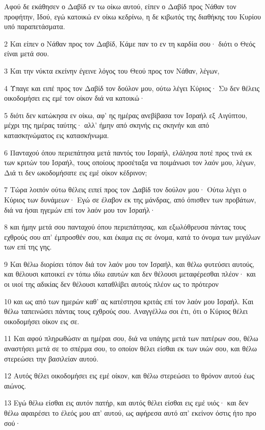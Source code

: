 \par Αφού δε εκάθησεν ο Δαβίδ εν τω οίκω αυτού, είπεν ο Δαβίδ προς Νάθαν τον προφήτην, Ιδού, εγώ κατοικώ εν οίκω κεδρίνω, η δε κιβωτός της διαθήκης του Κυρίου υπό παραπετάσματα.
\par 2 Και είπεν ο Νάθαν προς τον Δαβίδ, Κάμε παν το εν τη καρδία σου· διότι ο Θεός είναι μετά σου.
\par 3 Και την νύκτα εκείνην έγεινε λόγος του Θεού προς τον Νάθαν, λέγων,
\par 4 Ύπαγε και ειπέ προς τον Δαβίδ τον δούλον μου, ούτω λέγει Κύριος· Συ δεν θέλεις οικοδομήσει εις εμέ τον οίκον διά να κατοικώ·
\par 5 διότι δεν κατώκησα εν οίκω, αφ' ης ημέρας ανεβίβασα τον Ισραήλ εξ Αιγύπτου, μέχρι της ημέρας ταύτης· αλλ' ήμην από σκηνής εις σκηνήν και από κατασκηνώματος εις κατασκήνωμα.
\par 6 Πανταχού όπου περιεπάτησα μετά παντός του Ισραήλ, ελάλησα ποτέ προς τινά εκ των κριτών του Ισραήλ, τους οποίους προσέταξα να ποιμάνωσι τον λαόν μου, λέγων, Διά τι δεν ωκοδομήσατε εις εμέ οίκον κέδρινον;
\par 7 Τώρα λοιπόν ούτω θέλεις ειπεί προς τον Δαβίδ τον δούλον μου· Ούτω λέγει ο Κύριος των δυνάμεων· Εγώ σε έλαβον εκ της μάνδρας, από όπισθεν των προβάτων, διά να ήσαι ηγεμών επί τον λαόν μου τον Ισραήλ·
\par 8 και ήμην μετά σου πανταχού όπου περιεπάτησας, και εξωλόθρευσα πάντας τους εχθρούς σου απ' έμπροσθέν σου, και έκαμα εις σε όνομα, κατά το όνομα των μεγάλων των επί της γης.
\par 9 Και θέλω διορίσει τόπον διά τον λαόν μου τον Ισραήλ, και θέλω φυτεύσει αυτούς, και θέλουσι κατοικεί εν τόπω ιδίω εαυτών και δεν θέλουσι μεταφέρεσθαι πλέον· και οι υιοί της αδικίας δεν θέλουσι καταθλίβει αυτούς πλέον ως το πρότερον
\par 10 και ως από των ημερών καθ' ας κατέστησα κριτάς επί τον λαόν μου Ισραήλ. Και θέλω ταπεινώσει πάντας τους εχθρούς σου. Αναγγέλλω σοι έτι, ότι ο Κύριος θέλει οικοδομήσει οίκον εις σε.
\par 11 Και αφού πληρωθώσιν αι ημέραι σου, διά να υπάγης μετά των πατέρων σου, θέλω αναστήσει μετά σε το σπέρμα σου, το οποίον θέλει είσθαι εκ των υιών σου, και θέλω στερεώσει την βασιλείαν αυτού.
\par 12 Αυτός θέλει οικοδομήσει εις εμέ οίκον, και θέλω στερεώσει το θρόνον αυτού έως αιώνος.
\par 13 Εγώ θέλω είσθαι εις αυτόν πατήρ, και αυτός θέλει είσθαι εις εμέ υιός· και δεν θέλω αφαιρέσει το έλεός μου απ' αυτού, ως αφήρεσα αυτό απ' εκείνον όστις ήτο προ σού·
